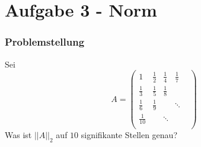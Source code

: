 \documentclass[xcolor = dvipsnames, notheorems, 10pt]{beamer}
\theoremstyle{definition}
\begin{document}
\section{Aufgabe 3 - Norm}
\begin{frame}
	\frametitle{Problemstellung}
	Sei
		$$A = \begin{pmatrix}
			1				& \frac{1}{2} 	& \frac{1}{4} 	& \frac{1}{7} 	& \\
			\frac{1}{3}		& \frac{1}{5}	& \frac{1}{8}	& 				& \\
			\frac{1}{6}		& \frac{1}{9}	&				& \ddots		& \\
			\frac{1}{10}	& 				& \ddots		&				& \\
		\end{pmatrix}$$
	Was ist $||A||_2$ auf $10$ signifikante Stellen genau?

\end{frame}
\end{document}

